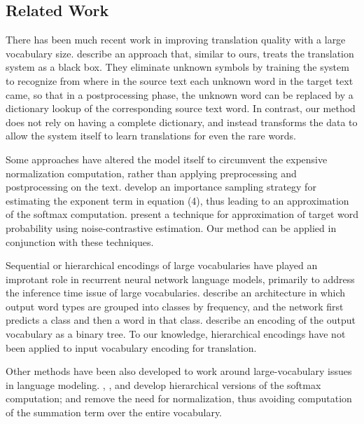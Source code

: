 \subsection{Related Work}
There has been much recent work in improving translation quality with a large vocabulary size.
 describe an approach
that, similar to ours, treats the translation system as a black box. They eliminate unknown symbols by training the
system to recognize from where in the source text each unknown word in the target text came, so that in a postprocessing
 phase, the unknown word can be replaced by a dictionary lookup of the corresponding source text word. In contrast,
our method does not rely on having a complete dictionary, and instead transforms the data to allow the system itself to
learn translations for even the rare words.

Some approaches have altered the model itself to circumvent the expensive normalization computation, rather than
applying preprocessing and postprocessing on the text. 
develop an importance sampling strategy for estimating the exponent term in equation (4), thus leading to
an approximation of the softmax computation. 
present a technique for approximation of target word probability using noise-contrastive estimation. Our method can
be applied in conjunction with these techniques.

Sequential or hierarchical encodings of large vocabularies have played an
improtant role in recurrent neural network language models, primarily to
address the inference time issue of large vocabularies. 
describe an architecture in which output word types are grouped into classes by
frequency, and the network first predicts a class and then a word in that
class.  describe an encoding of the output
vocabulary as a binary tree. To our knowledge, hierarchical encodings have not
been applied to input vocabulary encoding for translation.

Other methods have been also developed to work around large-vocabulary issues in
language modeling. , ,
and  develop hierarchical versions of
the softmax computation; 
and  remove the need for normalization,
thus avoiding computation of the summation term over the entire vocabulary.

